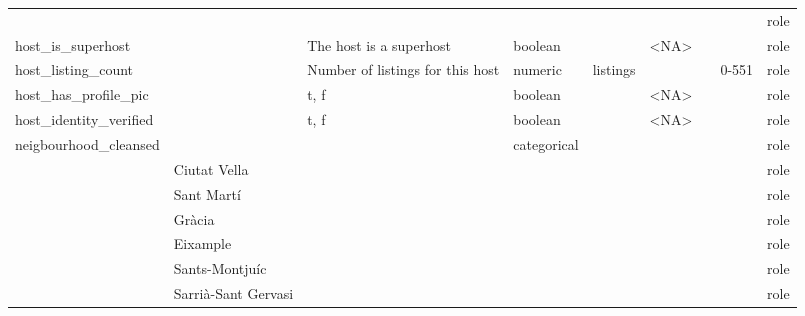 \begin{center}
\begin{longtable}{@{}lllllllll@{}}
                            &                             &                                   &             &                &                             &                     &         & role \\
host\_is\_superhost         &                             & The host is a superhost & boolean &                & \textless{}NA\textgreater{} &                     &         & role \\
host\_listing\_count        &                             & Number of listings for this host & numeric     & listings       &                             &                     & 0-551   & role \\
host\_has\_profile\_pic     &                             & t, f & boolean     &                & \textless{}NA\textgreater{} &                     &         & role \\
host\_identity\_verified    &                             & t, f & boolean     &                & \textless{}NA\textgreater{} &                     &         & role \\
neigbourhood\_cleansed      &                             &                                   & categorical &                &                             &                     &         & role \\
                            & Ciutat Vella                &                                   &             &                &                             &                     &         & role \\
                            & Sant Martí                  &                                   &             &                &                             &                     &         & role \\
                            & Gràcia                      &                                   &             &                &                             &                     &         & role \\
                            & Eixample                    &                                   &             &                &                             &                     &         & role \\
                            & Sants-Montjuíc              &                                   &             &                &                             &                     &         & role \\
                            & Sarrià-Sant Gervasi         &                                   &             &                &                             &                     &         & role \\

\end{longtable}
\end{center}
